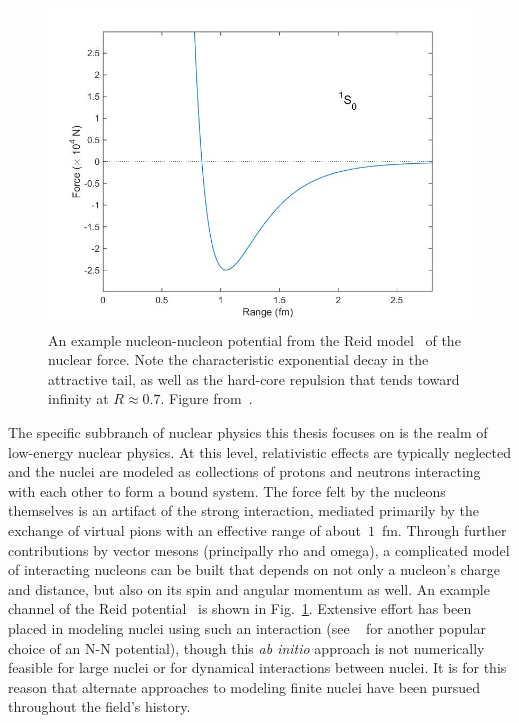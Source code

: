 \begin{figure}
	\includegraphics[width=\textwidth]{../Figures/intro_figs/ReidForce2.jpg}
	\caption{An example nucleon-nucleon potential from the Reid model~\citep{reid1968} of the nuclear force. Note the characteristic exponential decay in the attractive tail, as well as the hard-core repulsion that tends toward infinity at $R\approx0.7$. Figure from~\citep{bdushaw}.}
	\label{fig:reid}
\end{figure}

The specific subbranch of nuclear physics this thesis focuses on is the realm of low-energy nuclear physics.
At this level, relativistic effects are typically neglected and the nuclei are modeled as collections of protons and neutrons interacting with each other to form a bound system.
The force felt by the nucleons themselves is an artifact of the strong interaction, mediated primarily by the exchange of virtual pions with an effective range of about~$1$~fm.
Through further contributions by vector mesons (principally rho and omega), a complicated model of interacting nucleons can be built that depends on not only a nucleon's charge and distance, but also on its spin and angular momentum as well.
An example channel of the Reid potential~\citep{reid1968}  is shown in Fig.~\ref{fig:reid}.
Extensive effort has been placed in modeling nuclei using such an interaction (see ~\citep{wiringa1995} for another popular choice of an N-N potential), though this \textit{ab initio} approach is not numerically feasible for large nuclei or for dynamical interactions between nuclei.
It is for this reason that alternate approaches to modeling finite nuclei have been pursued throughout the field's history.

